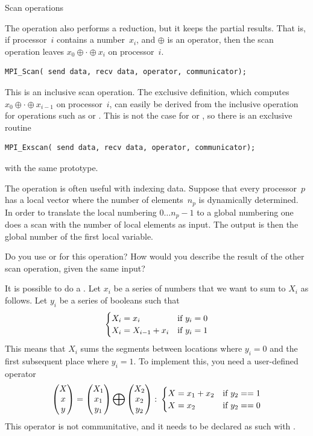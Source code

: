  {Scan operations}

The  operation also performs a reduction, but it keeps 
the partial results. That is, if processor~$i$ contains a number~$x_i$, 
and $\oplus$ is an operator,
then the scan operation leaves $x_0\oplus\cdot\oplus x_i$ on processor~$i$.
\begin{verbatim}
MPI_Scan( send data, recv data, operator, communicator);
\end{verbatim}
This is an inclusive scan operation. The exclusive definition, which computes
$x_0\oplus\cdot\oplus x_{i-1}$ on processor~$i$, can easily be derived
from the inclusive operation for operations such as  or .
This is not the case for  or , so there is an
exclusive routine
\begin{verbatim}
MPI_Exscan( send data, recv data, operator, communicator);
\end{verbatim}
with the same prototype. 

The  operation is often useful with indexing data. Suppose that
every processor~$p$ has a local vector where the number of elements~$n_p$ is dynamically 
determined. In order to translate the local numbering $0\ldots n_p-1$ to a global numbering
one does a scan with the number of local elements as input. The output is then the global 
number of the first local variable.

\begin{exercise}
  Do you use  or  for this operation? How
  would you describe the result of the other scan operation, given the
  same input?
\end{exercise}

It is possible to do a . Let $x_i$ be a series of numbers
that we want to sum to $X_i$ as follows. Let $y_i$ be a series of booleans such that
\[ 
\begin{cases}
  X_i=x_i&\hbox{if $y_i=0$}\\
  X_i=X_{i-1}+x_i&\hbox{if $y_i=1$}
\end{cases}
\]
This means that $X_i$ sums the segments between locations where $y_i=0$ and the
first subsequent place where $y_i=1$. To implement this, you need a user-defined operator
\[ 
\begin{pmatrix}  X\\ x\\ y\end{pmatrix}
=
\begin{pmatrix}  X_1\\ x_1\\ y_1\end{pmatrix}
\bigoplus
\begin{pmatrix}  X_2\\ x_2\\ y_2\end{pmatrix}\colon
  \begin{cases}
    X=x_1+x_2&\hbox{if $y_2==1$}\\ X=x_2&\hbox{if $y_2==0$}
  \end{cases}
\]
This operator is not communitative, and it needs to be declared as such
with .

